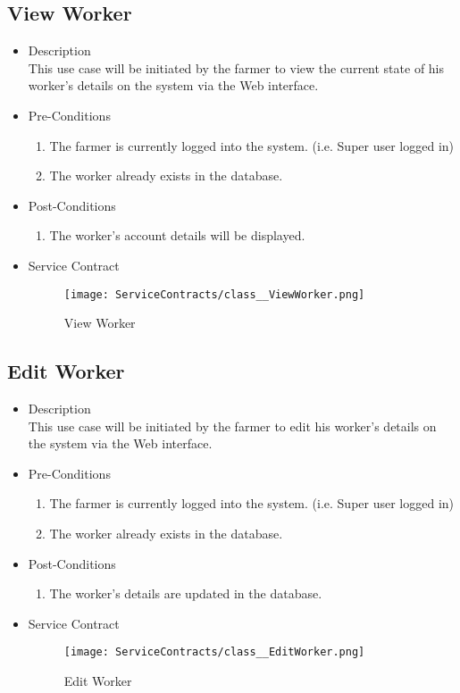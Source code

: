 \documentclass[11pt,fleqn]{book} %
\begin{document}
\subsection{View Worker}
\begin{itemize}
	\item Description\\
	This use case will be initiated by the farmer to view the current state of his worker’s details on the system via the Web interface.
	\item Pre-Conditions
	\begin{enumerate}
		\item The farmer is currently logged into the system. (i.e. Super user logged in)
		\item The worker already exists in the database.					
	\end{enumerate}
	\item Post-Conditions
	\begin{enumerate}
		\item The worker’s account details will be displayed.
	\end{enumerate}
	\item Service Contract
	\begin{figure}
		\texttt{[image: ServiceContracts/class\_\_ViewWorker.png]}
		\caption{View Worker}
	\end{figure}
\end{itemize}

\subsection{Edit Worker}
\begin{itemize}
	\item Description\\
	This use case will be initiated by the farmer to edit his worker’s details on the system via the Web interface.
	\item Pre-Conditions
	\begin{enumerate}
		\item The farmer is currently logged into the system. (i.e. Super user logged in)
		\item The worker already exists in the database.					
	\end{enumerate}
	\item Post-Conditions
	\begin{enumerate}
		\item The worker’s details are updated in the database.
	\end{enumerate}
	\item Service Contract
	\begin{figure}
		\texttt{[image: ServiceContracts/class\_\_EditWorker.png]}
		\caption{Edit Worker}
	\end{figure}
\end{itemize}
\end{document}
